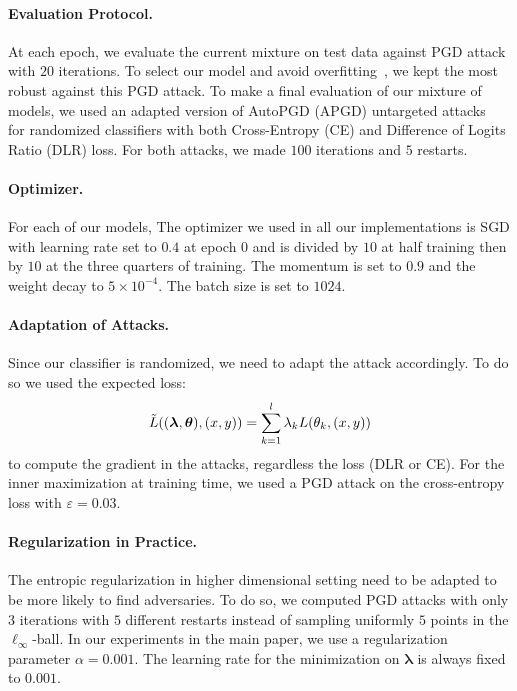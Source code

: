\paragraph{Evaluation Protocol.} At each epoch, we evaluate the current mixture on test data against PGD attack  with $20$ iterations. To select our model and avoid overfitting~\citep{rice2020overfitting}, we kept the most robust against this PGD attack.
To make a final evaluation of our mixture of models, we used an adapted version of {AutoPGD} (APGD) untargeted attacks~\citep{croce2020reliable} for randomized classifiers with both Cross-Entropy (CE) and Difference of Logits Ratio (DLR) loss. For both attacks, we made $100$ iterations and $5$ restarts.

\paragraph{Optimizer.} For each of our models, The optimizer we used in all our implementations is SGD with learning rate set to $0.4$ at epoch $0$ and is divided by $10$ at half training then by $10$ at the three quarters of training. The momentum is set to $0.9$ and the weight decay to $5\times10^{-4}$. The batch size is set to $1024$. 
\paragraph{Adaptation of Attacks.} Since our classifier is randomized, we need to adapt the attack accordingly. To do so we used the expected loss:
\begin{align*}
\Tilde{\loss}\left((\bm{\lambda},\bm{\theta}),(x,y)\right) = \sum_{k=1}^l \lambda_k \loss(\theta_k,(x,y))
\end{align*}
to compute the gradient in the attacks, regardless the loss (DLR or CE). For the inner maximization at training time, we used a PGD attack on the cross-entropy loss with $\varepsilon=0.03$. 
\paragraph{Regularization in Practice.} The entropic regularization in higher dimensional setting need to be adapted to be more likely to find adversaries. To do so, we computed PGD attacks with only $3$ iterations with $5$ different restarts instead of sampling uniformly $5$ points  in the $\ell_\infty$-ball. In our experiments in the main paper, we use a regularization parameter $\alpha=0.001$. The learning rate for the minimization on $\bm{\lambda}$ is always fixed to $0.001$. 
